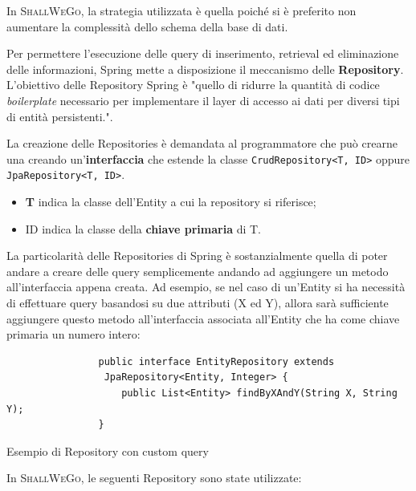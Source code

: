         In \textsc{ShallWeGo}, la strategia utilizzata è quella  poiché si è preferito non aumentare la complessità dello schema della base di dati.

        Per permettere l'esecuzione delle query di inserimento, retrieval ed eliminazione delle informazioni, Spring mette a disposizione il meccanismo delle \textbf{Repository}. L'obiettivo delle Repository Spring è "quello di ridurre la quantità di codice \textit{boilerplate} necessario per implementare il layer di accesso ai dati per diversi tipi di entità persistenti.".

        La creazione delle Repositories è demandata al programmatore che può crearne una creando un'\textbf{interfaccia} che estende la classe \texttt{CrudRepository<T, ID>} oppure \\ \texttt{JpaRepository<T, ID>}.

        \begin{itemize}
            \item \textbf{T} indica la classe dell'Entity a cui la repository si riferisce;
            \item ID indica la classe della \textbf{chiave primaria} di T.
        \end{itemize}

        La particolarità delle Repositories di Spring è sostanzialmente quella di poter andare a creare delle query semplicemente andando ad aggiungere un metodo all'interfaccia appena creata. Ad esempio, se nel caso di un'Entity si ha necessità di effettuare query basandosi su due attributi (X ed Y), allora sarà sufficiente aggiungere questo metodo all'interfaccia associata all'Entity che ha come chiave primaria un numero intero:

        \begin{code}
            \begin{verbatim}
                public interface EntityRepository extends
                 JpaRepository<Entity, Integer> {
                    public List<Entity> findByXAndY(String X, String Y);
                }
            \end{verbatim}
            \caption{Esempio di Repository con custom query}
        \end{code}

        In \textsc{ShallWeGo}, le seguenti Repository sono state utilizzate:


